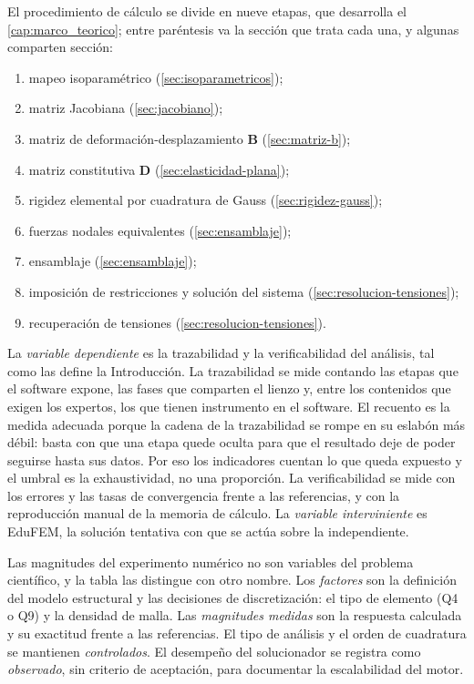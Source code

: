 El procedimiento de cálculo se divide en nueve etapas, que desarrolla el \autoref{cap:marco_teorico}; entre paréntesis va la sección que trata cada una, y algunas comparten sección:
\begin{enumerate}
    \item mapeo isoparamétrico (\autoref{sec:isoparametricos});
    \item matriz Jacobiana (\autoref{sec:jacobiano});
    \item matriz de deformación-desplazamiento $\bm{B}$ (\autoref{sec:matriz-b});
    \item matriz constitutiva $\bm{D}$ (\autoref{sec:elasticidad-plana});
    \item rigidez elemental por cuadratura de Gauss (\autoref{sec:rigidez-gauss});
    \item fuerzas nodales equivalentes (\autoref{sec:ensamblaje});
    \item ensamblaje (\autoref{sec:ensamblaje});
    \item imposición de restricciones y solución del sistema (\autoref{sec:resolucion-tensiones});
    \item recuperación de tensiones (\autoref{sec:resolucion-tensiones}).
\end{enumerate}

La \emph{variable dependiente} es la trazabilidad y la verificabilidad del análisis, tal como las define la Introducción. La trazabilidad se mide contando las etapas que el software expone, las fases que comparten el lienzo y, entre los contenidos que exigen los expertos, los que tienen instrumento en el software. El recuento es la medida adecuada porque la cadena de la trazabilidad se rompe en su eslabón más débil: basta con que una etapa quede oculta para que el resultado deje de poder seguirse hasta sus datos. Por eso los indicadores cuentan lo que queda expuesto y el umbral es la exhaustividad, no una proporción. La verificabilidad se mide con los errores y las tasas de convergencia frente a las referencias, y con la reproducción manual de la memoria de cálculo. La \emph{variable interviniente} es EduFEM, la solución tentativa con que se actúa sobre la independiente.

Las magnitudes del experimento numérico no son variables del problema científico, y la tabla las distingue con otro nombre. Los \emph{factores} son la definición del modelo estructural y las decisiones de discretización: el tipo de elemento (Q4 o Q9) y la densidad de malla. Las \emph{magnitudes medidas} son la respuesta calculada y su exactitud frente a las referencias. El tipo de análisis y el orden de cuadratura se mantienen \emph{controlados}. El desempeño del solucionador se registra como \emph{observado}, sin criterio de aceptación, para documentar la escalabilidad del motor.

